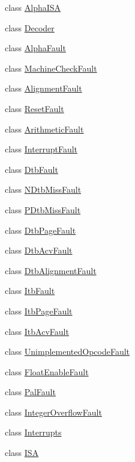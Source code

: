 \begin{DoxyCompactItemize}
\item 
class \hyperlink{classAlphaISA_1_1AlphaISA}{AlphaISA}
\item 
class \hyperlink{classAlphaISA_1_1Decoder}{Decoder}
\item 
class \hyperlink{classAlphaISA_1_1AlphaFault}{AlphaFault}
\item 
class \hyperlink{classAlphaISA_1_1MachineCheckFault}{MachineCheckFault}
\item 
class \hyperlink{classAlphaISA_1_1AlignmentFault}{AlignmentFault}
\item 
class \hyperlink{classAlphaISA_1_1ResetFault}{ResetFault}
\item 
class \hyperlink{classAlphaISA_1_1ArithmeticFault}{ArithmeticFault}
\item 
class \hyperlink{classAlphaISA_1_1InterruptFault}{InterruptFault}
\item 
class \hyperlink{classAlphaISA_1_1DtbFault}{DtbFault}
\item 
class \hyperlink{classAlphaISA_1_1NDtbMissFault}{NDtbMissFault}
\item 
class \hyperlink{classAlphaISA_1_1PDtbMissFault}{PDtbMissFault}
\item 
class \hyperlink{classAlphaISA_1_1DtbPageFault}{DtbPageFault}
\item 
class \hyperlink{classAlphaISA_1_1DtbAcvFault}{DtbAcvFault}
\item 
class \hyperlink{classAlphaISA_1_1DtbAlignmentFault}{DtbAlignmentFault}
\item 
class \hyperlink{classAlphaISA_1_1ItbFault}{ItbFault}
\item 
class \hyperlink{classAlphaISA_1_1ItbPageFault}{ItbPageFault}
\item 
class \hyperlink{classAlphaISA_1_1ItbAcvFault}{ItbAcvFault}
\item 
class \hyperlink{classAlphaISA_1_1UnimplementedOpcodeFault}{UnimplementedOpcodeFault}
\item 
class \hyperlink{classAlphaISA_1_1FloatEnableFault}{FloatEnableFault}
\item 
class \hyperlink{classAlphaISA_1_1PalFault}{PalFault}
\item 
class \hyperlink{classAlphaISA_1_1IntegerOverflowFault}{IntegerOverflowFault}
\item 
class \hyperlink{classAlphaISA_1_1Interrupts}{Interrupts}
\item 
class \hyperlink{classAlphaISA_1_1ISA}{ISA}
\item 

\end{DoxyCompactItemize}
